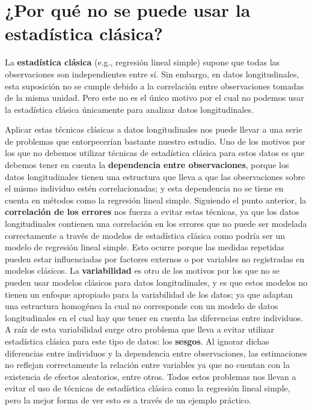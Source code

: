 \documentclass[
  letterpaper,
  DIV=11,
  numbers=noendperiod]{scrreprt}
\begin{document}
\section{¿Por qué no se puede usar la estadística
clásica?}\label{por-quuxe9-no-se-puede-usar-la-estaduxedstica-cluxe1sica}

La \textbf{estadística clásica} (e.g., regresión lineal simple) supone
que todas las observaciones son independientes entre sí. Sin embargo, en
datos longitudinales, esta suposición no se cumple debido a la
correlación entre observaciones tomadas de la misma unidad. Pero este no
es el único motivo por el cual no podemos usar la estadística clásica
únicamente para analizar datos longitudinales.

Aplicar estas técnicas clásicas a datos longitudinales nos puede llevar
a una serie de problemas que entorpecerían bastante nuestro estudio. Uno
de los motivos por los que no debemos utilizar técnicas de estadística
clásica para estos datos es que debemos tener en cuenta la
\textbf{dependencia entre observaciones}, porque los datos
longitudinales tienen una estructura que lleva a que las observaciones
sobre el mismo individuo estén correlacionadas; y esta dependencia no se
tiene en cuenta en métodos como la regresión lineal simple. Siguiendo el
punto anterior, la \textbf{correlación de los errores} nos fuerza a
evitar estas técnicas, ya que los datos longitudinales contienen una
correlación en los errores que no puede ser modelada correctamente a
través de modelos de estadística clásica como podría ser un modelo de
regresión lineal simple. Esto ocurre porque las medidas repetidas pueden
estar influenciadas por factores externos o por variables no registradas
en modelos clásicos. La \textbf{variabilidad} es otro de los motivos por
los que no se pueden usar modelos clásicos para datos longitudinales, y
es que estos modelos no tienen un enfoque apropiado para la variabilidad
de los datos; ya que adaptan una estructura homogénea la cual no
corresponde con un modelo de datos longitudinales en el cual hay que
tener en cuenta las diferencias entre individuos. A raíz de esta
variabilidad surge otro problema que lleva a evitar utilizar estadística
clásica para este tipo de datos: los \textbf{sesgos}. Al ignorar dichas
diferencias entre individuos y la dependencia entre observaciones, las
estimaciones no reflejan correctamente la relación entre variables ya
que no cuentan con la existencia de efectos aleatorios, entre otros.
Todos estos problemas nos llevan a evitar el uso de técnicas de
estadística clásica como la regresión lineal simple, pero la mejor forma
de ver esto es a través de un ejemplo práctico.
\end{document}
